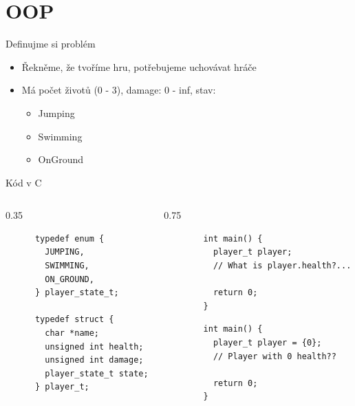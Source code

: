\documentclass[aspectratio=1610]{beamer}
\begin{document}
\section{OOP}

\begin{frame}{Definujme si problém}

\begin{itemize}
  \item Řekněme, že tvoříme hru, potřebujeme uchovávat hráče
  \item Má počet životů (0 - 3), damage: 0 - inf, stav:
    \begin{itemize}
      \item Jumping
      \item Swimming
      \item OnGround
    \end{itemize}
\end{itemize}

\end{frame}

\begin{frame}[fragile]{Kód v C}

  \begin{columns}
    \begin{column}{0.35\textwidth}

      \begin{verbatim}
      typedef enum {
        JUMPING,
        SWIMMING,
        ON_GROUND,
      } player_state_t;

      typedef struct {
        char *name;
        unsigned int health;
        unsigned int damage;
        player_state_t state;
      } player_t;
      \end{verbatim}
    \end{column}
    \begin{column}{0.75\textwidth}

        \pause
        \begin{verbatim}
        int main() {
          player_t player;
          // What is player.health?...

          return 0;
        }
        \end{verbatim}

        \begin{verbatim}
        int main() {
          player_t player = {0};
          // Player with 0 health??

          return 0;
        }
        \end{verbatim}

    \end{column}

  \end{columns}

\end{frame}
\end{document}
